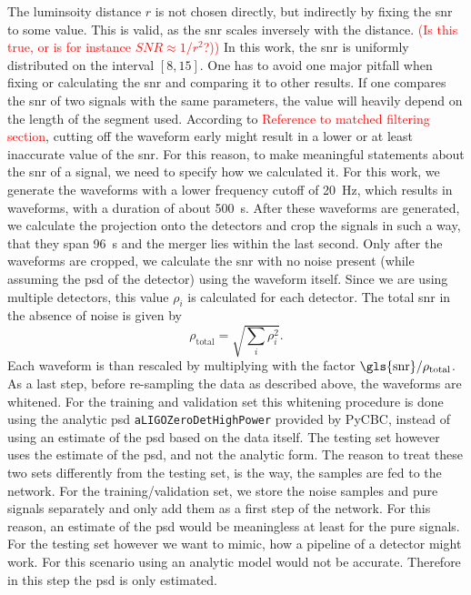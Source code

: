 The luminsoity distance $r$ is not chosen directly, but indirectly by fixing the \gls{snr} to some value. This is valid, as the \gls{snr} scales inversely with the distance. \textcolor{red}{(Is this true, or is for instance $SNR\approx 1/r^2$?))} In this work, the \gls{snr} is uniformly distributed on the interval $\left[8,15\right]$. One has to avoid one major pitfall when fixing or calculating the \gls{snr} and comparing it to other results. If one compares the \gls{snr} of two signals with the same parameters, the value will heavily depend on the length of the segment used. According to \textcolor{red}{Reference to matched filtering section}, cutting off the waveform early might result in a lower or at least inaccurate value of the \gls{snr}. For this reason, to make meaningful statements about the \gls{snr} of a signal, we need to specify how we calculated it. For this work, we generate the waveforms with a lower frequency cutoff of \SI{20}{\hertz}, which results in waveforms, with a duration of about \SI{500}{\s}. After these waveforms are generated, we calculate the projection onto the detectors and crop the signals in such a way, that they span \SI{96}{\s} and the merger lies within the last second. Only after the waveforms are cropped, we calculate the \gls{snr} with no noise present (while assuming the \gls{psd} of the detector) using the waveform itself. Since we are using multiple detectors, this value $\rho_i$ is calculated for each detector. The total \gls{snr} in the absence of noise is given by
\begin{equation}
\rho_\text{total} = \sqrt{\sum_i\rho_i^2}.
\end{equation}
Each waveform is than rescaled by multiplying with the factor $\text{\gls{snr}} / \rho_\text{total}$. As a last step, before re-sampling the data as described above, the waveforms are whitened. For the training and validation set this whitening procedure is done using the analytic \gls{psd} \verb|aLIGOZeroDetHighPower| provided by PyCBC, instead of using an estimate of the \gls{psd} based on the data itself. The testing set however uses the estimate of the \gls{psd}, and not the analytic form. The reason to treat these two sets differently from the testing set, is the way, the samples are fed to the network. For the training/validation set, we store the noise samples and pure signals separately and only add them as a first step of the network. For this reason, an estimate of the \gls{psd} would be meaningless at least for the pure signals. For the testing set however we want to mimic, how a pipeline of a detector might work. For this scenario using an analytic model would not be accurate. Therefore in this step the \gls{psd} is only estimated.\\
